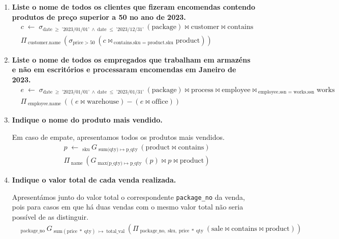 \documentclass[12pt,a4paper]{article}
\newcommand{\op}{\text}
\begin{document}
  \vspace*{10pt}
  \begin{enumerate}
    \item \textbf{Liste o nome de todos os clientes que fizeram encomendas contendo produtos de preço superior a 50\textmd{\texteuro} no ano de 2023.}
    \[
      \begin{aligned}
        & c \; \leftarrow \; \sigma_{\op{date} \; \geq \; \text{'2023/01/01'} ~\land~ \op{date} \; \leq \; \text{'2023/12/31'} \;}(\op{package}) \bowtie \op{customer} \bowtie \op{contains} \\
        & \Pi _{\; \op{customer.name} \;}( \sigma _{\op{price} \; > \; \op{50} \;} (c \bowtie _{\; \op{contains.sku = product.sku}}\op{product}))
      \end{aligned}
    \]

    \item \textbf{Liste o nome de todos os empregados que trabalham em armazéns e não em escritórios e processaram encomendas em Janeiro de 2023.}
    \[
      \begin{aligned}
        & e \; \leftarrow \; \sigma_{\op{date} \; \geq \; \text{'2023/01/01'} ~\land~ \op{date} \; \leq \; \text{'2023/01/31'} \;}(\op{package}) \bowtie \op{process} \bowtie \op{employee} \bowtie _{\; \op{employee.ssn = works.ssn}} \op{works} \\
        & \Pi _{\; \op{employee.name} \;}((e \bowtie \op{warehouse}) - (e \bowtie \op{office}))
      \end{aligned}
    \]

    \item \textbf{Indique o nome do produto mais vendido.}

    Em caso de empate, apresentamos todos os produtos mais vendidos.
    \[
      \begin{aligned}
        & p \; \leftarrow \; _{\op{sku} \;} G _{\; \op{sum(qty)} \; \mapsto \; \op{p\_qty} \;}(\op{product} \bowtie \op{contains}) \\
        & \Pi _{\; \op{name} \;}(G _{\; \op{max(p\_qty)} \; \mapsto \; \op{p\_qty} \;}(p) \bowtie p \bowtie \op{product})
      \end{aligned}
    \]

    \item \textbf{Indique o valor total de cada venda realizada.}

    Apresentámos junto do valor total o correspondente \texttt{package\_no} da venda, pois para casos em que
    há duas vendas com o mesmo valor total não seria possível de as distinguir.
    \[
      \begin{aligned}
          & _{\op{package\_no} \;} G _{\; \op{sum}(\op{price} \; * \; \op{qty}) \; \mapsto \; \op{total\_val} \;}(\Pi _{ \; \op{package\_no}, \; \op{sku}, \; \op{price} \; * \; \op{qty} \;}(\op{sale} \bowtie \op{contains} \bowtie \op{product}))
      \end{aligned}
    \]
  \end{enumerate}
\end{document}
